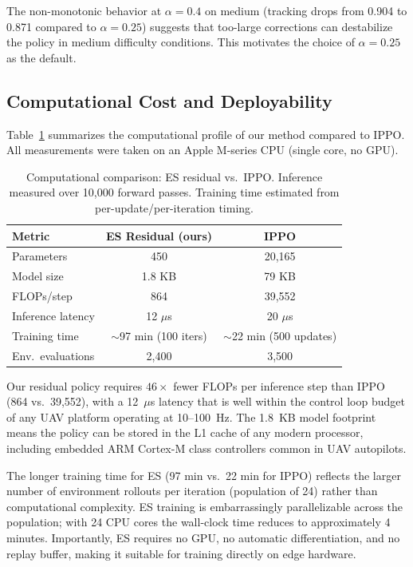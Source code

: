 \documentclass[journal]{IEEEtran}
\begin{document}
The non-monotonic behavior at $\alpha = 0.4$ on medium (tracking drops from 0.904 to
0.871 compared to $\alpha = 0.25$) suggests that too-large corrections can destabilize
the policy in medium difficulty conditions. This motivates the choice of
$\alpha = 0.25$ as the default.

\subsection{Computational Cost and Deployability}
\label{sec:compute}

Table~\ref{tab:compute} summarizes the computational profile of our method compared
to IPPO. All measurements were taken on an Apple M-series CPU (single core, no GPU).

\begin{table}[t]
\centering
\caption{Computational comparison: ES residual vs.\ IPPO. Inference measured over
10,000 forward passes. Training time estimated from per-update/per-iteration timing.}
\label{tab:compute}
\scriptsize
\setlength{\tabcolsep}{5pt}
\begin{tabular}{@{}lcc@{}}
\toprule
Metric & ES Residual (ours) & IPPO \\
\midrule
Parameters          & 450          & 20,165 \\
Model size          & 1.8 KB       & 79 KB \\
FLOPs/step          & 864          & 39,552 \\
Inference latency   & 12 $\mu$s    & 20 $\mu$s \\
Training time       & $\sim$97 min (100 iters) & $\sim$22 min (500 updates) \\
Env.\ evaluations   & 2,400        & 3,500 \\
\bottomrule
\end{tabular}
\end{table}

Our residual policy requires $46\times$ fewer FLOPs per inference step than IPPO
(864 vs.\ 39,552), with a 12~$\mu$s latency that is well within the control loop
budget of any UAV platform operating at 10--100~Hz. The 1.8~KB model footprint
means the policy can be stored in the L1 cache of any modern processor, including
embedded ARM Cortex-M class controllers common in UAV autopilots.

The longer training time for ES (97 min vs.\ 22 min for IPPO) reflects the larger
number of environment rollouts per iteration (population of 24) rather than
computational complexity. ES training is embarrassingly parallelizable across the
population; with 24 CPU cores the wall-clock time reduces to approximately 4 minutes.
Importantly, ES requires no GPU, no automatic differentiation, and no replay buffer,
making it suitable for training directly on edge hardware.
\end{document}
